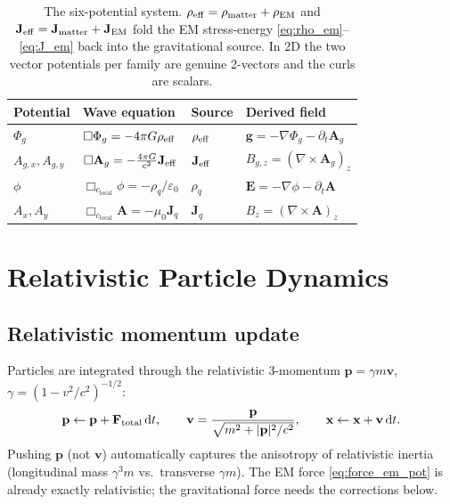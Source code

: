 \documentclass[11pt]{article}
\newcommand{\Phig}{\Phi_g}                 %
\newcommand{\Ag}{\mathbf{A}_g}             %
\newcommand{\vv}[1]{\mathbf{#1}}           %
\newcommand{\dd}{\mathrm{d}}               %
\newcommand{\clocal}{c_{\mathrm{local}}}
\begin{document}
\begin{table}[h]
\centering
\begin{tabular}{@{}L{2.4cm}L{4.6cm}L{2.6cm}L{3.2cm}@{}}
\toprule
\textbf{Potential} & \textbf{Wave equation} & \textbf{Source} & \textbf{Derived field} \\
\midrule
$\Phig$    & $\Box\Phig = -4\pi G\rho_{\rm eff}$              & $\rho_{\rm eff}$            & $\vv{g}=-\nabla\Phig-\partial_t\Ag$ \\
$A_{g,x},A_{g,y}$ & $\Box\Ag = -\tfrac{4\pi G}{c^2}\vv{J}_{\rm eff}$ & $\vv{J}_{\rm eff}$ & $B_{g,z}=(\nabla\times\Ag)_z$ \\
$\phi$     & $\Box_{\clocal}\phi = -\rho_q/\varepsilon_0$     & $\rho_q$                   & $\vv{E}=-\nabla\phi-\partial_t\vv{A}$ \\
$A_x,A_y$  & $\Box_{\clocal}\vv{A} = -\mu_0\vv{J}_q$          & $\vv{J}_q$                 & $B_z=(\nabla\times\vv{A})_z$ \\
\bottomrule
\end{tabular}
\caption{The six-potential system. $\rho_{\rm eff}=\rho_{\rm matter}+\rho_{\rm
EM}$ and $\vv{J}_{\rm eff}=\vv{J}_{\rm matter}+\vv{J}_{\rm EM}$ fold the EM
stress-energy \eqref{eq:rho_em}--\eqref{eq:J_em} back into the gravitational
source. In 2D the two vector potentials per family are genuine 2-vectors and the
curls are scalars.}
\label{tab:sixfield}
\end{table}

\section{Relativistic Particle Dynamics}
\label{sec:dynamics}

\subsection{Relativistic momentum update}

Particles are integrated through the relativistic 3-momentum $\vv{p}=\gamma
m\vv{v}$, $\gamma = (1-v^2/c^2)^{-1/2}$:
\begin{equation}
\label{eq:pupdate}
  \vv{p}\leftarrow \vv{p}+\vv{F}_{\rm total}\,\dd t, \qquad
  \vv{v} = \frac{\vv{p}}{\sqrt{m^2+|\vv{p}|^2/c^2}}, \qquad
  \vv{x}\leftarrow\vv{x}+\vv{v}\,\dd t .
\end{equation}
Pushing $\vv{p}$ (not $\vv{v}$) automatically captures the anisotropy of
relativistic inertia (longitudinal mass $\gamma^3 m$ vs.\ transverse $\gamma
m$).  The EM force \eqref{eq:force_em_pot} is already exactly relativistic; the
gravitational force needs the corrections below.
\end{document}
